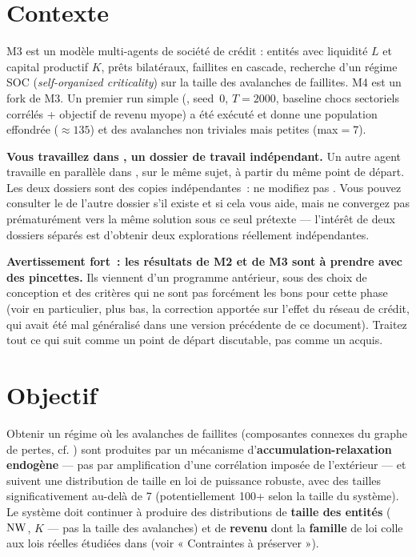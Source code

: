 \section*{Contexte}

M3 est un modèle multi-agents de société de crédit : entités avec liquidité
\(L\) et capital productif \(K\), prêts bilatéraux, faillites en cascade,
recherche d'un régime SOC (\emph{self-organized criticality}) sur la taille
des avalanches de faillites. M4 est un fork de M3. Un premier run simple
(, seed~0, $T{=}2000$, baseline chocs sectoriels
corrélés + objectif de revenu myope) a été exécuté et donne une population
effondrée ($\approx 135$) et des avalanches non triviales mais petites
(max$=7$).

\textbf{Vous travaillez dans \Workspace{}, un dossier de travail
indépendant.} Un autre agent travaille en parallèle dans \OtherWorkspace{},
sur le même sujet, à partir du même point de départ. Les deux dossiers sont
des copies indépendantes~: ne modifiez pas \OtherWorkspace{}. Vous pouvez
consulter le  de l'autre dossier s'il existe et si cela vous
aide, mais ne convergez pas prématurément vers la même solution sous ce
seul prétexte — l'intérêt de deux dossiers séparés est d'obtenir deux
explorations réellement indépendantes.

\textbf{Avertissement fort~: les résultats de M2 et de M3 sont à prendre
avec des pincettes.} Ils viennent d'un programme antérieur, sous des choix
de conception et des critères qui ne sont pas forcément les bons pour cette
phase (voir en particulier, plus bas, la correction apportée sur l'effet du
réseau de crédit, qui avait été mal généralisé dans une version précédente
de ce document). Traitez tout ce qui suit comme un point de départ
discutable, pas comme un acquis.

\section*{Objectif}

Obtenir un régime où les avalanches de faillites (composantes connexes du
graphe de pertes, cf. ) sont
produites par un mécanisme d'\textbf{accumulation-relaxation endogène} — pas
par amplification d'une corrélation imposée de l'extérieur — et suivent une
distribution de taille en loi de puissance robuste, avec des tailles
significativement au-delà de 7 (potentiellement 100+ selon la taille du
système). Le système doit continuer à produire des distributions de
\textbf{taille des entités} ($\mathrm{NW}$, $K$ — pas la taille des avalanches) et de
\textbf{revenu} dont la \textbf{famille} de loi colle aux lois réelles
étudiées dans  (voir « Contraintes à préserver »).

